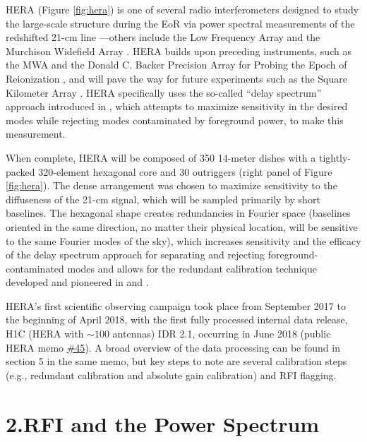 \documentclass[12pt]{article}
\begin{document}
HERA (Figure \ref{fig:hera}) is one of several radio interferometers designed to study the large-scale structure during the EoR via power spectral measurements of the redshifted 21-cm line \citep{deboer2017}---others include the Low Frequency Array \citep[LOFAR;][]{vanHaarlem2013} and the Murchison Widefield Array \citep[MWA;][]{tingay2013}. HERA builds upon preceding instruments, such as the MWA and the Donald C. Backer Precision Array for Probing the Epoch of Reionization \citep[PAPER;][]{parsons2010}, and will pave the way for future experiments such as the Square Kilometer Array \cite[SKA; e.g.,][]{mellema2013}. HERA specifically uses the so-called ``delay spectrum'' approach introduced in \cite{parsons2012}, which attempts to maximize sensitivity in the desired modes while rejecting modes contaminated by foreground power, to make this measurement.

When complete, HERA will be composed of 350 14-meter dishes with a tightly-packed 320-element hexagonal core and 30 outriggers (right panel of Figure \ref{fig:hera}). The dense arrangement was chosen to maximize sensitivity to the diffuseness of the 21-cm signal, which will be sampled primarily by short baselines. The hexagonal shape creates redundancies in Fourier space (baselines oriented in the same direction, no matter their physical location, will be sensitive to the same Fourier modes of the sky), which increases sensitivity and the efficacy of the delay spectrum approach for separating and rejecting foreground-contaminated modes and allows for the redundant calibration technique developed and pioneered in \cite{liu2010} and \cite{zheng2014}.

HERA's first scientific observing campaign took place from September 2017 to the beginning of April 2018, with the first fully processed internal data release, H1C (HERA with $\sim 100$ antennas) IDR 2.1, occurring in June 2018 (public HERA memo \href{http://reionization.org/wp-content/uploads/2018/07/IDR2.1_Memo_v2.html}{\#45}). A broad overview of the data processing can be found in section 5 in the same memo, but key steps to note are several calibration steps (e.g., redundant calibration and absolute gain calibration) and RFI flagging. \vspace{3mm}

\tocless\section{\hypertarget{sec:rfipspec}{2.\hspace{0.75em}RFI and the Power Spectrum}}
\end{document}
